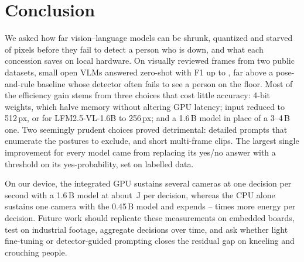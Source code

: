 \section{Conclusion}
\label{sec:conclusion}
We asked how far vision--language models can be shrunk, quantized and starved of pixels before they fail to detect a person who is down, and what each concession saves on local hardware. On \BenchNKept{} visually reviewed frames from two public datasets, small open VLMs answered zero-shot with F1 up to \RBestFone, far above a pose-and-rule baseline whose detector often fails to see a person on the floor. Most of the efficiency gain stems from three choices that cost little accuracy: 4-bit weights, which halve memory without altering GPU latency; input reduced to 512\,px, or for LFM2.5-VL-1.6B to 256\,px; and a 1.6\,B model in place of a 3--4\,B one. Two seemingly prudent choices proved detrimental: detailed prompts that enumerate the postures to exclude, and short multi-frame clips. The largest single improvement for every model came from replacing its yes/no answer with a threshold on its yes-probability, set on labelled data.

On our device, the integrated GPU sustains several cameras at one decision per second with a 1.6\,B model at about \PLfmMQfourTwofiftysixOneGpuJ\,J per decision, whereas the CPU alone sustains one camera with the 0.45\,B model and expends \PCpuGpuRatioMin--\PCpuGpuRatioMax{} times more energy per decision. Future work should replicate these measurements on embedded boards, test on industrial footage, aggregate decisions over time, and ask whether light fine-tuning or detector-guided prompting closes the residual gap on kneeling and crouching people.
